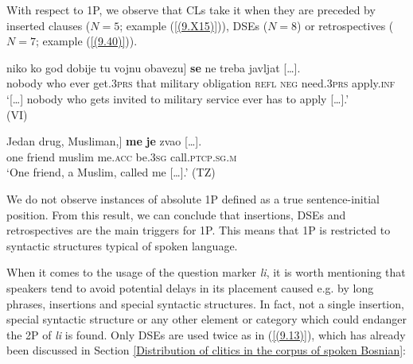
\noindent With respect to 1P, we observe that CLs take it when they are preceded by inserted clauses ($N=5$; example (\ref{(9.X15)})), DSEs ($N=8$) or retrospectives ($N=7$; example (\ref{(9.40)})).

\begin{exe}\ex\label{(9.X15)}
\gll  [\dots] niko \minsp{[} ko god dobije tu vojnu obavezu] \textbf{se} ne treba {javljat  [\dots].} \\
{} nobody {} who ever get.3\textsc{prs} that military obligation \textsc{refl} \textsc{neg} need.3\textsc{prs} apply.\textsc{inf} \\
\glt ‘[\dots] nobody who gets invited to military service ever has to apply  [\dots].’ \\
\hfill (VI)

\ex\label{(9.40)}
\gll Jedan drug, \minsp{[} Musliman,] \textbf{me} \textbf{je} {zvao  [\dots].}  \\
one friend {} muslim me.\textsc{acc} be.3\textsc{sg} call.\textsc{ptcp}.\textsc{sg}.\textsc{m} \\
\glt ‘One friend, a Muslim, called me  [\dots].’ 
\hfill (TZ)
\end{exe}

\noindent We do not observe instances of absolute 1P defined as a true sentence-initial position. From this result, we can conclude that insertions, DSEs and retrospectives are the main triggers for 1P. This means that 1P is restricted to syntactic structures typical of spoken language.

When it comes to the usage of the question marker \textit{li}, it is worth mentioning that speakers tend to avoid potential delays in its placement caused e.g. by long phrases, insertions and special syntactic structures. In fact, not a single insertion, special syntactic structure or any other element or category which could endanger the 2P of \textit{li} is found. Only DSEs are used twice as in  (\ref{(9.13)}), which has already been discussed in Section \ref{Distribution of clitics in the corpus of spoken Bosnian}:

